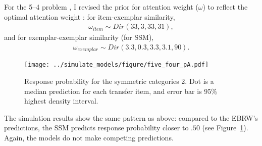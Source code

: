 \documentclass[doc]{apa6}
\begin{document}
For the 5--4 problem \parencite{Medin1978a}, I revised the prior for attention weight ($\omega$) to
reflect the optimal attention weight \parencite{Lamberts1995a}: for item-exemplar similarity,
\begin{align}
    \omega_{item} \sim Dir(33, 3, 33, 31),
\end{align}
and for exemplar-exemplar similarity (for SSM),
\begin{align}
    \omega_{exemplar} \sim Dir(3.3, 0.3, 3.3, 3.1, 90).
\end{align}

\begin{figure}[h!]
    \texttt{[image: ../simulate\_models/figure/five\_four\_pA.pdf]}

    \caption{Response probability for the symmetric categories 2. Dot is a median prediction for
    each transfer item, and error bar is 95\% highest density interval.}

\label{fig:five_four_pA}
\end{figure}

The simulation results show the same pattern as above: compared to the EBRW's predictions, the SSM
predicts response probability closer to $.50$ (see Figure~\ref{fig:five_four_pA}). Again, the models
do not make competing predictions.



\printbibliography{}
\end{document}
